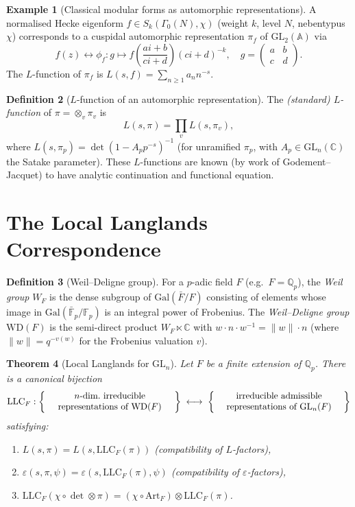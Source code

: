 \documentclass[12pt,a4paper]{amsart}
\newtheorem{theorem}{Theorem}[section]
\theoremstyle{definition}
\newtheorem{definition}[theorem]{Definition}
\newtheorem{example}[theorem]{Example}
\newcommand{\Q}{\mathbb{Q}}
\newcommand{\C}{\mathbb{C}}
\newcommand{\F}{\mathbb{F}}
\newcommand{\GL}{\mathrm{GL}}
\newcommand{\Gal}{\mathrm{Gal}}
\newcommand{\WD}{\mathrm{WD}}
\newcommand{\Art}{\mathrm{Art}}
\begin{document}
\begin{example}[Classical modular forms as automorphic representations]
A normalised Hecke eigenform $f \in S_k(\Gamma_0(N), \chi)$ (weight $k$,
level $N$, nebentypus $\chi$) corresponds to a cuspidal automorphic
representation $\pi_f$ of $\GL_2(\mathbb{A})$ via
\[
  f(z) \leftrightarrow \phi_f : g \mapsto f\!\left(\frac{ai+b}{ci+d}\right)
  (ci+d)^{-k}, \quad g = \begin{pmatrix} a & b \\ c & d \end{pmatrix}.
\]
The $L$-function of $\pi_f$ is $L(s, f) = \sum_{n \ge 1} a_n n^{-s}$.
\end{example}

\begin{definition}[$L$-function of an automorphic representation]
\label{def:automorphic_l}
The \emph{(standard) $L$-function} of $\pi = \otimes_v \pi_v$ is
\[
  L(s, \pi) = \prod_v L(s, \pi_v),
\]
where $L(s, \pi_p) = \det(1 - A_p p^{-s})^{-1}$ (for unramified $\pi_p$,
with $A_p \in \GL_n(\C)$ the Satake parameter).
These $L$-functions are known (by work of Godement--Jacquet) to have analytic
continuation and functional equation.
\end{definition}

\section{The Local Langlands Correspondence}

\begin{definition}[Weil--Deligne group]
\label{def:weil_deligne}
For a $p$-adic field $F$ (e.g.\ $F = \Q_p$), the \emph{Weil group} $W_F$ is
the dense subgroup of $\Gal(\bar{F}/F)$ consisting of elements whose image
in $\Gal(\bar{\F}_p/\F_p)$ is an integral power of Frobenius.
The \emph{Weil--Deligne group} $\WD(F)$ is the semi-direct product
$W_F \ltimes \C$ with $w \cdot n \cdot w^{-1} = \|w\|\cdot n$
(where $\|w\| = q^{-v(w)}$ for the Frobenius valuation $v$).
\end{definition}

\begin{theorem}[Local Langlands for $\GL_n$]
\label{thm:local_langlands}
Let $F$ be a finite extension of $\Q_p$.  There is a canonical bijection
\[
  \mathrm{LLC}_F :
  \left\{\parbox{5cm}{\centering $n$-dim.\ irreducible representations of $\WD(F)$}\right\}
  \;\longleftrightarrow\;
  \left\{\parbox{5cm}{\centering irreducible admissible representations of $\GL_n(F)$}\right\}
\]
satisfying:
\begin{enumerate}[label=(\roman*)]
  \item $L(s, \pi) = L(s, \mathrm{LLC}_F(\pi))$ (compatibility of $L$-factors),
  \item $\varepsilon(s, \pi, \psi) = \varepsilon(s, \mathrm{LLC}_F(\pi), \psi)$ (compatibility of $\varepsilon$-factors),
  \item $\mathrm{LLC}_F(\chi \circ \det \otimes \pi) = (\chi \circ \Art_F) \otimes \mathrm{LLC}_F(\pi)$.
\end{enumerate}
\end{theorem}
\end{document}
